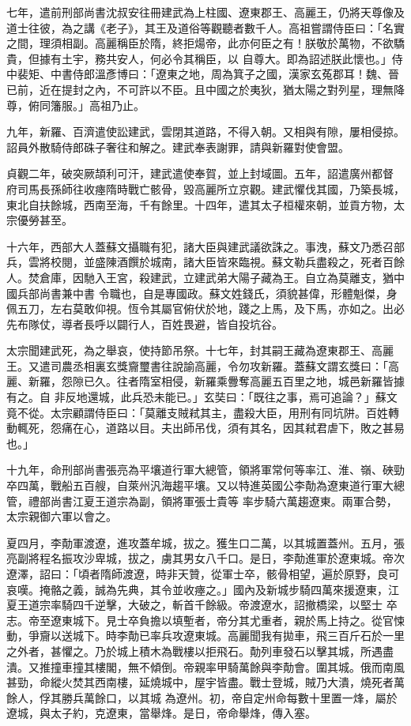 \begin{pinyinscope}
 七年，遣前刑部尚書沈叔安往冊建武為上柱國、遼東郡王、高麗王，仍將天尊像及道士往彼，為之講《老子》，其王及道俗等觀聽者數千人。高祖嘗謂侍臣曰：「名實之間，理須相副。高麗稱臣於隋，終拒煬帝，此亦何臣之有！朕敬於萬物，不欲驕貴，但據有土宇，務共安人，何必令其稱臣，以
 自尊大。即為詔述朕此懷也。」侍中裴矩、中書侍郎溫彥博曰：「遼東之地，周為箕子之國，漢家玄菟郡耳！魏、晉已前，近在提封之內，不可許以不臣。且中國之於夷狄，猶太陽之對列星，理無降尊，俯同籓服。」高祖乃止。



 九年，新羅、百濟遣使訟建武，雲閉其道路，不得入朝。又相與有隙，屢相侵掠。詔員外散騎侍郎硃子奢往和解之。建武奉表謝罪，請與新羅對使會盟。



 貞觀二年，破突厥頡利可汗，建武遣使奉賀，並上封域圖。五年，詔遣廣州都督
 府司馬長孫師往收瘞隋時戰亡骸骨，毀高麗所立京觀。建武懼伐其國，乃築長城，東北自扶餘城，西南至海，千有餘里。十四年，遣其太子桓權來朝，並貢方物，太宗優勞甚至。



 十六年，西部大人蓋蘇文攝職有犯，諸大臣與建武議欲誅之。事洩，蘇文乃悉召部兵，雲將校閱，並盛陳酒饌於城南，諸大臣皆來臨視。蘇文勒兵盡殺之，死者百餘人。焚倉庫，因馳入王宮，殺建武，立建武弟大陽子藏為王。自立為莫離支，猶中國兵部尚書兼中書
 令職也，自是專國政。蘇文姓錢氏，須貌甚偉，形體魁傑，身佩五刀，左右莫敢仰視。恆令其屬官俯伏於地，踐之上馬，及下馬，亦如之。出必先布隊仗，導者長呼以闢行人，百姓畏避，皆自投坑谷。



 太宗聞建武死，為之舉哀，使持節吊祭。十七年，封其嗣王藏為遼東郡王、高麗王。又遣司農丞相裏玄獎齎璽書往說諭高麗，令勿攻新羅。蓋蘇文謂玄獎曰：「高麗、新羅，怨隙已久。往者隋室相侵，新羅乘釁奪高麗五百里之地，城邑新羅皆據有之。自
 非反地還城，此兵恐未能已。」玄奘曰：「既往之事，焉可追論？」蘇文竟不從。太宗顧謂侍臣曰：「莫離支賊弒其主，盡殺大臣，用刑有同坑阱。百姓轉動輒死，怨痛在心，道路以目。夫出師吊伐，須有其名，因其弒君虐下，敗之甚易也。」



 十九年，命刑部尚書張亮為平壤道行軍大總管，領將軍常何等率江、淮、嶺、硤勁卒四萬，戰船五百艘，自萊州汎海趨平壤。又以特進英國公李勣為遼東道行軍大總管，禮部尚書江夏王道宗為副，領將軍張士貴等
 率步騎六萬趨遼東。兩軍合勢，太宗親御六軍以會之。



 夏四月，李勣軍渡遼，進攻蓋牟城，拔之。獲生口二萬，以其城置蓋州。五月，張亮副將程名振攻沙卑城，拔之，虜其男女八千口。是日，李勣進軍於遼東城。帝次遼澤，詔曰：「頃者隋師渡遼，時非天贊，從軍士卒，骸骨相望，遍於原野，良可哀嘆。掩骼之義，誠為先典，其令並收瘞之。」國內及新城步騎四萬來援遼東，江夏王道宗率騎四千逆擊，大破之，斬首千餘級。帝渡遼水，詔撤橋梁，以堅士
 卒志。帝至遼東城下。見士卒負擔以填塹者，帝分其尤重者，親於馬上持之。從官悚動，爭齎以送城下。時李勣已率兵攻遼東城。高麗聞我有拋車，飛三百斤石於一里之外者，甚懼之。乃於城上積木為戰樓以拒飛石。勣列車發石以擊其城，所遇盡潰。又推撞車撞其樓閣，無不傾倒。帝親率甲騎萬餘與李勣會。圍其城。俄而南風甚勁，命縱火焚其西南樓，延燒城中，屋宇皆盡。戰士登城，賊乃大潰，燒死者萬餘人，俘其勝兵萬餘口，以其城
 為遼州。初，帝自定州命每數十里置一烽，屬於遼城，與太子約，克遼東，當舉烽。是日，帝命舉烽，傳入塞。




\end{pinyinscope}
